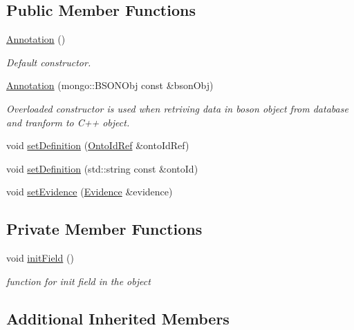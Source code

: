 \subsection*{Public Member Functions}
\begin{DoxyCompactItemize}
\item 
\hyperlink{classunisys_1_1Annotation_a08702dfa8f734012f7c68d7317a3a540}{Annotation} ()
\begin{DoxyCompactList}\small\item\em Default constructor. \end{DoxyCompactList}\item 
\hyperlink{classunisys_1_1Annotation_a36f2000bdfe49eef240bdf0dabd3df2d}{Annotation} (mongo\-::\-B\-S\-O\-N\-Obj const \&bson\-Obj)
\begin{DoxyCompactList}\small\item\em Overloaded constructor is used when retriving data in boson object from database and tranform to C++ object. \end{DoxyCompactList}\item 
void \hyperlink{classunisys_1_1Annotation_a61390650d258397c76f8482318d58741}{set\-Definition} (\hyperlink{classunisys_1_1OntoIdRef}{Onto\-Id\-Ref} \&onto\-Id\-Ref)
\item 
void \hyperlink{classunisys_1_1Annotation_ac10cd6a0c92eb085de8a7e3ba76a8069}{set\-Definition} (std\-::string const \&onto\-Id)
\item 
void \hyperlink{classunisys_1_1Annotation_a61aed5074b5497728e9ce33eeb3e2b4c}{set\-Evidence} (\hyperlink{classunisys_1_1Evidence}{Evidence} \&evidence)
\end{DoxyCompactItemize}
\subsection*{Private Member Functions}
\begin{DoxyCompactItemize}
\item 
void \hyperlink{classunisys_1_1Annotation_a56a0503bd22b05cae674b8d4df046d9e}{init\-Field} ()
\begin{DoxyCompactList}\small\item\em function for init field in the object \end{DoxyCompactList}\end{DoxyCompactItemize}
\subsection*{Additional Inherited Members}


